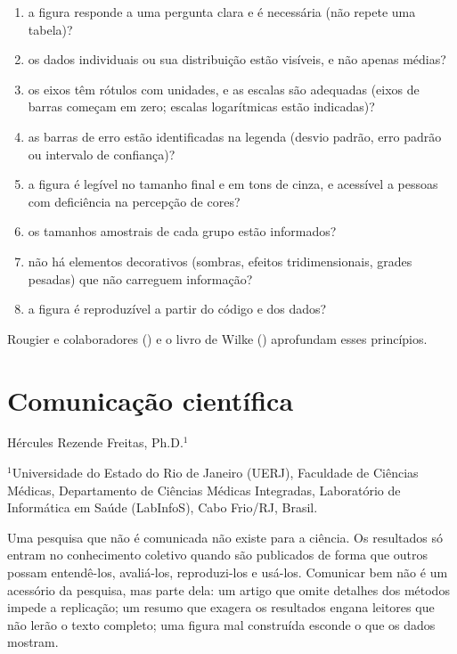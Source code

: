 \documentclass[
]{book}
\providecommand{\tightlist}{%
  \setlength{\itemsep}{0pt}\setlength{\parskip}{0pt}}
\begin{document}
\begin{enumerate}
\def\labelenumi{\arabic{enumi}.}
\tightlist
\item
  a figura responde a uma pergunta clara e é necessária (não repete uma tabela)?
\item
  os dados individuais ou sua distribuição estão visíveis, e não apenas médias?
\item
  os eixos têm rótulos com unidades, e as escalas são adequadas (eixos de barras começam em zero; escalas logarítmicas estão indicadas)?
\item
  as barras de erro estão identificadas na legenda (desvio padrão, erro padrão ou intervalo de confiança)?
\item
  a figura é legível no tamanho final e em tons de cinza, e acessível a pessoas com deficiência na percepção de cores?
\item
  os tamanhos amostrais de cada grupo estão informados?
\item
  não há elementos decorativos (sombras, efeitos tridimensionais, grades pesadas) que não carreguem informação?
\item
  a figura é reproduzível a partir do código e dos dados?
\end{enumerate}

Rougier e colaboradores () e o livro de Wilke () aprofundam esses princípios.

\chapter{Comunicação científica}\label{comunicauxe7uxe3o-cientuxedfica}

Hércules Rezende Freitas, Ph.D.\(^1\)

\(^1\)Universidade do Estado do Rio de Janeiro (UERJ), Faculdade de Ciências Médicas, Departamento de Ciências Médicas Integradas, Laboratório de Informática em Saúde (LabInfoS), Cabo Frio/RJ, Brasil.

Uma pesquisa que não é comunicada não existe para a ciência. Os resultados só entram no conhecimento coletivo quando são publicados de forma que outros possam entendê-los, avaliá-los, reproduzi-los e usá-los. Comunicar bem não é um acessório da pesquisa, mas parte dela: um artigo que omite detalhes dos métodos impede a replicação; um resumo que exagera os resultados engana leitores que não lerão o texto completo; uma figura mal construída esconde o que os dados mostram.
\end{document}
